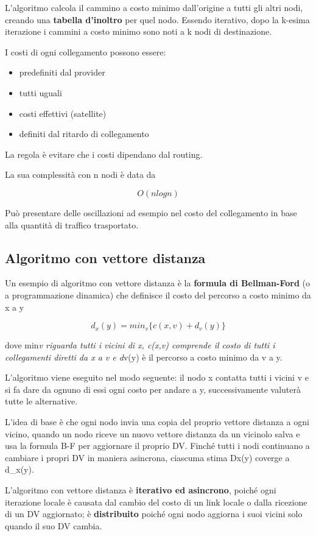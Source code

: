 \documentclass[
]{article}
\begin{document}
L'algoritmo calcola il cammino a costo minimo dall'origine a tutti gli
altri nodi, creando una \textbf{tabella d'inoltro} per quel nodo.
Essendo iterativo, dopo la k-esima iterazione i cammini a costo minimo
sono noti a k nodi di destinazione.

I costi di ogni collegamento possono essere:

\begin{itemize}
\item
  predefiniti dal provider
\item
  tutti uguali
\item
  costi effettivi (satellite)
\item
  definiti dal ritardo di collegamento
\end{itemize}

La regola è evitare che i costi dipendano dal routing.

La sua complessità con n nodi è data da

\[O(nlogn)\]

Può presentare delle oscillazioni ad esempio nel costo del collegamento
in base alla quantità di traffico trasportato.

\hypertarget{header-n196}{%
\subsection{Algoritmo con vettore distanza}\label{header-n196}}

Un esempio di algoritmo con vettore distanza è la \textbf{formula di
Bellman-Ford} (o a programmazione dinamica) che definisce il costo del
percorso a costo minimo da x a y

\[d_x(y) = min_v\{c(x,v) + d_v(y)\}\]

dove min\emph{v riguarda tutti i vicini di x, c(x,v) comprende il costo
di tutti i collegamenti diretti da x a v e d}v(y) è il percorso a costo
minimo da v a y.

L'algoritmo viene eseguito nel modo seguente: il nodo x contatta tutti i
vicini v e si fa dare da ognuno di essi ogni costo per andare a y,
successivamente valuterà tutte le alternative.

L'idea di base è che ogni nodo invia una copia del proprio vettore
distanza a ogni vicino, quando un nodo riceve un nuovo vettore distanza
da un vicinolo salva e usa la formula B-F per aggiornare il proprio DV.
Finché tutti i nodi continuano a cambiare i propri DV in maniera
asincrona, ciascuma stima Dx(y) coverge a d\_x(y).

L'algoritmo con vettore distanza è \textbf{iterativo ed asincrono},
poiché ogni iterazione locale è causata dal cambio del costo di un link
locale o dalla ricezione di un DV aggiornato; è \textbf{distribuito}
poiché ogni nodo aggiorna i suoi vicini solo quando il suo DV cambia.
\end{document}
